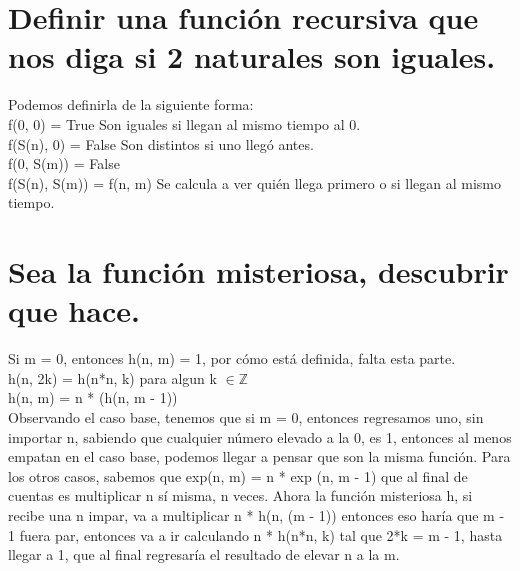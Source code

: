 \documentclass[11pt,letterpaper]{article}
\newcommand\tab[1][1cm]{\hspace*{#1}}
\begin{document}
\section{Definir una función recursiva que nos diga si 2 naturales son iguales.}
Podemos definirla de la siguiente forma:\\

\tab [0.4cm]f(0, 0) = True \tab Son iguales si llegan al mismo tiempo al 0.\\
\tab f(S(n), 0) = False \tab Son distintos si uno llegó antes.\\
\tab f(0, S(m)) = False\\
\tab f(S(n), S(m)) = f(n, m) \tab Se calcula a ver quién llega primero o si llegan al mismo tiempo.\\

\section{Sea la función misteriosa, descubrir que hace.}

Si m = 0, entonces h(n, m) = 1, por cómo está definida, falta esta parte.\\

\tab[0.4cm]h(n, 2k) = h(n*n, k) para algun k $\in\mathbb{Z}$\\
\tab h(n, m) = n * (h(n, m - 1))\\

Observando el caso base, tenemos que si m = 0, entonces regresamos uno, sin importar n, sabiendo que cualquier número elevado a la 0, es 1, entonces al menos empatan en el caso base, podemos llegar a pensar que son la misma función. Para los otros casos, sabemos que exp(n, m) = n * exp (n, m - 1) que al final de cuentas es multiplicar n sí misma, n veces. Ahora la función misteriosa h, si recibe una n impar, va a multiplicar n * h(n, (m - 1)) entonces eso haría que m - 1 fuera par, entonces va a ir calculando n * h(n*n, k) tal que 2*k = m - 1, hasta llegar a 1, que al final regresaría el resultado de elevar n a la m.
\end{document}
